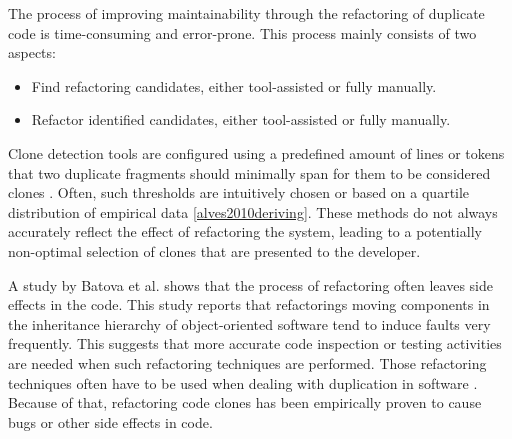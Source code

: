 The process of improving maintainability through the refactoring of duplicate code is time-consuming and error-prone. This process mainly consists of two aspects:
\begin{itemize}
	\item Find refactoring candidates, either tool-assisted or fully manually.
	\item Refactor identified candidates, either tool-assisted or fully manually.
\end{itemize}
Clone detection tools are configured using a predefined amount of lines or tokens that two duplicate fragments should minimally span for them to be considered clones \cite{sajnani2016sourcerercc, svajlenko2016bigcloneeval}. Often, such thresholds are intuitively chosen \cite{li2006cp, roy2009mutation} or based on a quartile distribution of empirical data \ref{alves2010deriving}. These methods do not always accurately reflect the effect of refactoring the system, leading to a potentially non-optimal selection of clones that are presented to the developer.

A study by Batova et al. \cite{bavota2012does} shows that the process of refactoring often leaves side effects in the code. This study reports that refactorings moving components in the inheritance hierarchy of object-oriented software tend to induce faults very frequently. This suggests that more accurate code inspection or testing activities are needed when such refactoring techniques are performed. Those refactoring techniques often have to be used when dealing with duplication in software \cite{fowler2018refactoring, fontana2015duplicated}. Because of that, refactoring code clones has been empirically proven to cause bugs or other side effects in code.

